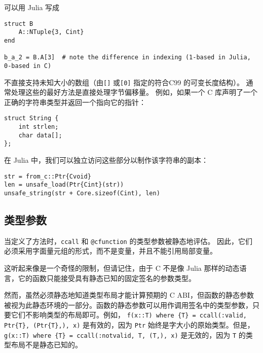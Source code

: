 可以用 Julia 写成




\begin{verbatim}
struct B
    A::NTuple{3, Cint}
end

b_a_2 = B.A[3]  # note the difference in indexing (1-based in Julia, 0-based in C)
\end{verbatim}



不直接支持未知大小的数组（由\texttt{[]} 或\texttt{[0]} 指定的符合C99 的可变长度结构）。 通常处理这些的最好方法是直接处理字节偏移量。 例如，如果一个 C 库声明了一个正确的字符串类型并返回一个指向它的指针：




\begin{lstlisting}
struct String {
    int strlen;
    char data[];
};
\end{lstlisting}



在 Julia 中，我们可以独立访问这些部分以制作该字符串的副本：




\begin{verbatim}
str = from_c::Ptr{Cvoid}
len = unsafe_load(Ptr{Cint}(str))
unsafe_string(str + Core.sizeof(Cint), len)
\end{verbatim}



\hypertarget{12275815582345064545}{}


\subsection{类型参数}



当定义了方法时，\texttt{ccall} 和 \texttt{@cfunction} 的类型参数被静态地评估。 因此，它们必须采用字面量元组的形式，而不是变量，并且不能引用局部变量。



这听起来像是一个奇怪的限制，但请记住，由于 C 不是像 Julia 那样的动态语言，它的函数只能接受具有静态已知的固定签名的参数类型。



然而，虽然必须静态地知道类型布局才能计算预期的 C ABI，但函数的静态参数被视为此静态环境的一部分。函数的静态参数可以用作调用签名中的类型参数，只要它们不影响类型的布局即可。例如， \texttt{f(x::T) where \{T\} = ccall(:valid, Ptr\{T\}, (Ptr\{T\},), x)} 是有效的，因为 \texttt{Ptr} 始终是字大小的原始类型。但是， \texttt{g(x::T) where \{T\} = ccall(:notvalid, T, (T,), x)} 是无效的，因为 \texttt{T} 的类型布局不是静态已知的。



